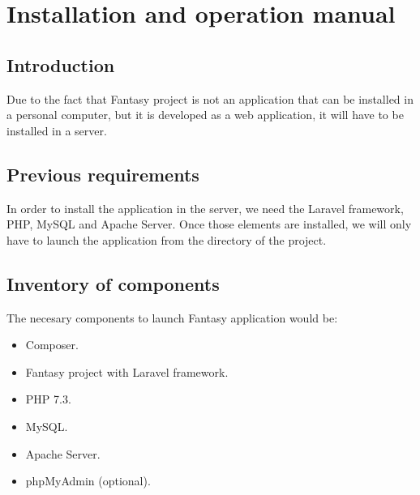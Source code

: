 \chapter{Installation and operation manual}
\section{Introduction}
Due to the fact that Fantasy project is not an application that can be installed in a personal computer, but it is developed as a web application, it will have to be installed in a server.

\section{Previous requirements}
In order to install the application in the server, we need the Laravel framework, PHP, MySQL and Apache Server. Once those elements are installed, we will only have to launch the application from the directory of the project.

\section{Inventory of components}
The necesary components to launch Fantasy application would be:
\begin{itemize}
	\item Composer.
	\item Fantasy project with Laravel framework.
	\item PHP 7.3.
	\item MySQL.
	\item Apache Server.
	\item phpMyAdmin (optional).
\end{itemize}

